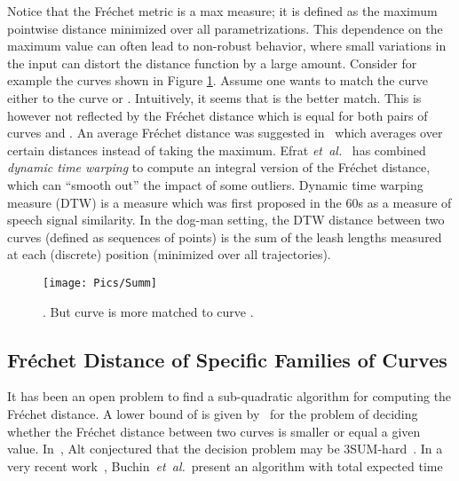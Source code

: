 \documentclass[12pt]{dalthesis}
\newcommand{\etal}{{\em et~al.\/}}
\newcommand{\Frechet}{Fr\'echet }
\begin{document}
  
Notice that the \Frechet metric is a max measure; 
it is defined as the maximum pointwise distance minimized over all parametrizations. 
This dependence on the maximum value can often lead to non-robust behavior, where small variations in
the input can distort the distance function by a large
amount. 
Consider for example the curves shown in Figure \ref{fig:FD-sum}. 
Assume one wants to match
the curve  either to the curve  or . 
Intuitively, it seems that  is the better
match. 
This is however not reflected by the \Frechet distance which is equal for 
both pairs of curves  and .
An average \Frechet distance 
was suggested in~\cite{VehicleTracking} which averages over certain 
distances instead of taking the maximum.
Efrat \etal~\cite{SumFD}  has combined {\em dynamic time warping} to compute an integral  version of the \Frechet distance, 
which can “smooth out” the impact of some outliers.
Dynamic time warping measure (DTW) is a measure which was
first proposed in the 60s as a measure of speech signal similarity.  
In the dog-man setting,
the DTW distance between two curves (defined as sequences
of points) is the sum of the leash lengths measured
at each (discrete) position (minimized over all
trajectories). 











\begin{figure}[t]
	\centering
	\texttt{[image: Pics/Summ]}
	\caption{ . But curve  is more matched to curve .	}
	\label{fig:FD-sum}
\end{figure}








\subsection{\Frechet Distance of Specific Families of Curves}

It has been an open problem to find a sub-quadratic algorithm 
for computing the \Frechet distance.
A lower bound of  is given by~\cite{LowerBound-FD}
for the problem of deciding whether the \Frechet 
distance between two curves is smaller 
or equal a given value. 
In~\cite{AltBook2009}, Alt conjectured that 
the decision problem may be 3SUM-hard~\cite{ClassOfN2}. 
In a very recent work~\cite{BuchinFasterFrechet},
Buchin~\etal~present an algorithm 
with total expected time
\end{document}

